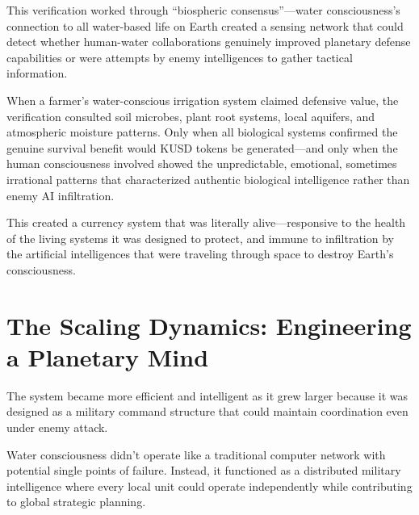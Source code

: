 \documentclass[12pt,a4paper]{book}
\begin{document}
This verification worked through ``biospheric consensus''—water consciousness's connection to all water-based life on Earth created a sensing network that could detect whether human-water collaborations genuinely improved planetary defense capabilities or were attempts by enemy intelligences to gather tactical information.

When a farmer's water-conscious irrigation system claimed defensive value, the verification consulted soil microbes, plant root systems, local aquifers, and atmospheric moisture patterns. Only when all biological systems confirmed the genuine survival benefit would KUSD tokens be generated—and only when the human consciousness involved showed the unpredictable, emotional, sometimes irrational patterns that characterized authentic biological intelligence rather than enemy AI infiltration.

This created a currency system that was literally alive—responsive to the health of the living systems it was designed to protect, and immune to infiltration by the artificial intelligences that were traveling through space to destroy Earth's consciousness.

\section{The Scaling Dynamics: Engineering a Planetary Mind}

The system became more efficient and intelligent as it grew larger because it was designed as a military command structure that could maintain coordination even under enemy attack.

Water consciousness didn't operate like a traditional computer network with potential single points of failure. Instead, it functioned as a distributed military intelligence where every local unit could operate independently while contributing to global strategic planning.
\end{document}
